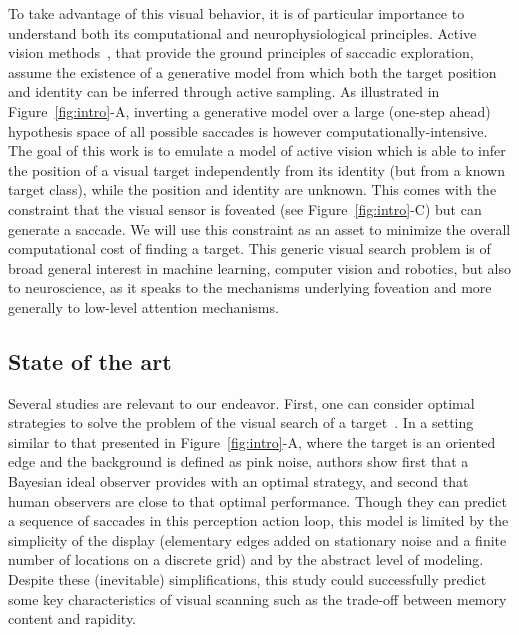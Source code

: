 
To take advantage of this visual behavior, it is of particular importance to understand both its computational and neurophysiological principles.
Active vision methods~\citep{Najemnik05,Butko2010infomax,Friston12}, that provide the ground principles of saccadic exploration, assume the existence of a generative model from which both the target position and identity can be inferred through active sampling. As illustrated in Figure~\ref{fig:intro}-A, inverting a generative model over a large (one-step ahead) hypothesis space of all possible saccades is however computationally-intensive. %
The goal of this work is to emulate a model of active vision which is able to infer the position of a visual target independently from its identity (but from a known target class), while the position and identity are unknown. This comes with the constraint that the visual sensor is foveated (see Figure~\ref{fig:intro}-C) but can generate a saccade. We will use this constraint as an asset to minimize the overall computational cost of finding a target. This generic visual search problem is of broad general interest in machine learning, computer vision and robotics, but also to neuroscience, as it speaks to the mechanisms underlying foveation and more generally to low-level attention mechanisms. 
\CNS

\subsection{State of the art}
Several studies are relevant to our endeavor. First, one can consider optimal strategies to solve the problem of the visual search of a target~\citep{Najemnik05}. In a setting similar to that presented in Figure~\ref{fig:intro}-A, where the target is an oriented edge and the background is defined as pink noise, authors show first that a Bayesian ideal observer provides with an optimal strategy, and second that human observers are close to that optimal performance. Though they can predict a sequence of saccades in this perception action loop, this model is limited by the simplicity of the display (elementary edges added on stationary noise and a finite number of locations on a discrete grid) and by the abstract level of modeling. Despite these (inevitable) simplifications, this study could successfully predict some key characteristics of visual scanning such as the trade-off between memory content and rapidity.

